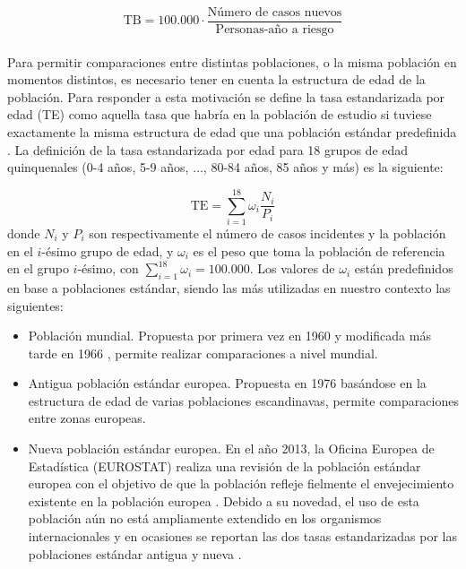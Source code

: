 $$\text{TB}  = 100.000 \cdot \dfrac{\text{Número de casos nuevos}}{\text{Personas-año a riesgo}}$$\\

Para permitir comparaciones entre distintas poblaciones, o la misma población en momentos distintos, es necesario tener en cuenta la estructura de edad de la población. Para responder a esta motivación se define la tasa estandarizada por edad (TE) como aquella tasa que habría en la población de estudio si tuviese exactamente la misma estructura de edad que una población estándar predefinida \cite{IARC1995}. La definición de la tasa estandarizada por edad para 18 grupos de edad quinquenales (0-4 años, 5-9 años, $\dots$, 80-84 años, 85 años y más) es la siguiente:

$$\text{TE} = \sum_{i = 1}^{18} \omega_i \dfrac{N_i}{P_i} $$
donde $N_i$ y $P_i$ son respectivamente el número de casos incidentes y la población en el $i$-ésimo grupo de edad, y $\omega_i$ es el peso que toma la población de referencia en el grupo $i$-ésimo, con $\sum_{i = 1}^{18}\omega_i = 100.000$. Los valores de ${\omega_i}$ están predefinidos en base a poblaciones estándar, siendo las más utilizadas en nuestro contexto las siguientes:

\begin{itemize}
	
	\item Población mundial. Propuesta por primera vez en 1960 \cite{SegiM.1960} y modificada más tarde en 1966 \cite{Doll1966}, permite realizar comparaciones a nivel mundial.
		
	\item Antigua población estándar europea. Propuesta en 1976 \cite{Waterhouse1976} basándose en la estructura de edad de varias poblaciones escandinavas, permite comparaciones entre zonas europeas.
	
	\item Nueva población estándar europea. En el año 2013, la Oficina Europea de Estadística (EUROSTAT) realiza una revisión de la población estándar europea con el objetivo de que la población refleje fielmente el envejecimiento existente en la población europea \cite{EUROSTAT2013}. Debido a su novedad, el uso de esta población aún no está ampliamente extendido en los organismos internacionales \cite{ECIS2} y en ocasiones se reportan las dos tasas estandarizadas por las poblaciones estándar antigua y nueva \cite{ECIS}.
	

\end{itemize}

